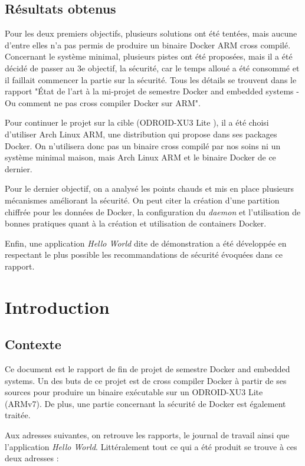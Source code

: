 \documentclass[11pt,a4paper,oneside]{report}
\newcommand{\oldreportname}{État de l’art à la mi-projet de semestre Docker and embedded systems - Ou comment ne pas cross compiler Docker sur ARM}
\newcommand{\odroid}{ODROID-XU3 Lite }
\begin{document}
\section{Résultats obtenus}
Pour les deux premiers objectifs, plusieurs solutions ont été tentées, mais aucune d'entre elles n'a pas permis de produire un binaire Docker ARM cross compilé. Concernant le système minimal, plusieurs pistes ont été proposées, mais il a été décidé de passer au 3e objectif, la sécurité, car le temps alloué a été consommé et il faillait commencer la partie sur la sécurité. Tous les détails se trouvent dans le rapport "\oldreportname".

Pour continuer le projet sur la cible (\odroid), il a été choisi d'utiliser Arch Linux ARM, une distribution qui propose dans ses packages Docker. On n’utilisera donc pas un binaire cross compilé par nos soins ni un système minimal maison, mais Arch Linux ARM et le binaire Docker de ce dernier.

Pour le dernier objectif, on a analysé les points chauds et mis en place plusieurs mécanismes améliorant la sécurité. On peut citer la création d'une partition chiffrée pour les données de Docker, la configuration du \textit{daemon} et l'utilisation de bonnes pratiques quant à la création et utilisation de containers Docker.

Enfin, une application \textit{Hello World} dite de démonstration a été développée en respectant le plus possible les recommandations de sécurité évoquées dans ce rapport.

\tableofcontents
{}

\pagestyle{normal}

\chapter{Introduction}

\section{Contexte}\label{contexte}

Ce document est le rapport de fin de projet de semestre Docker and embedded systems. Un des buts de ce projet est de cross compiler Docker à partir de ses sources pour produire un binaire exécutable sur un \odroid (ARMv7). De plus, une partie concernant la sécurité de Docker est également traitée.

Aux adresses suivantes, on retrouve les rapports, le journal de travail ainsi que l'application \textit{Hello World}. Littéralement tout ce qui a été produit se trouve à ces deux adresses :
\end{document}

